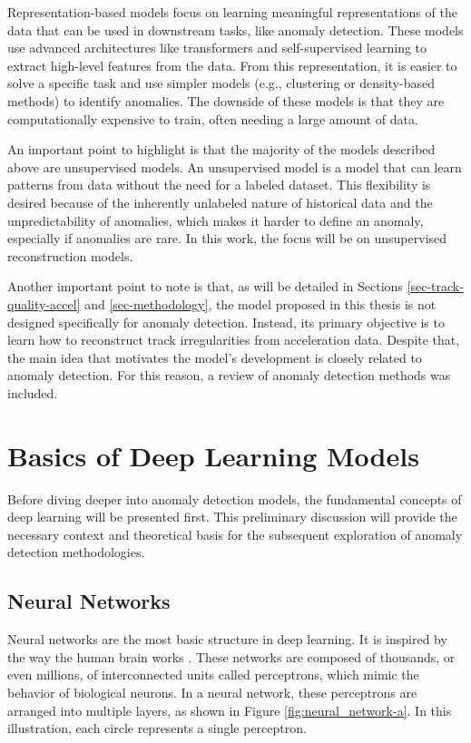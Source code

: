 Representation-based models focus on learning meaningful representations of the data that can be used in downstream tasks, like anomaly detection.  These models use advanced architectures like transformers and self-supervised learning to extract high-level features from the data. From this representation, it is easier to solve a specific task and use simpler models (e.g., clustering or density-based methods) to identify anomalies. The downside of these models is that they are computationally expensive to train, often needing a large amount of data.

An important point to highlight is that the majority of the models described above are unsupervised models. An unsupervised model is a model that can learn patterns from data without the need for a labeled dataset. This flexibility is desired because of the inherently unlabeled nature of historical data and the unpredictability of anomalies, which makes it harder to define an anomaly, especially if anomalies are rare. In this work, the focus will be on unsupervised reconstruction models.

Another important point to note is that, as will be detailed in Sections \ref{sec-track-quality-accel} and \ref{sec-methodology}, the model proposed in this thesis is not designed specifically for anomaly detection. Instead, its primary objective is to learn how to reconstruct track irregularities from acceleration data. Despite that, the main idea that motivates the model's development is closely related to anomaly detection. For this reason, a review of anomaly detection methods was included.

\section{Basics of Deep Learning Models}

Before diving deeper into anomaly detection models, the fundamental concepts of deep learning will be presented first. This preliminary discussion will provide the necessary context and theoretical basis for the subsequent exploration of anomaly detection methodologies.

\subsection{Neural Networks} \label{sec-Neural_networks}

Neural networks are the most basic structure in deep learning. It is inspired by the way the human brain works \cite{AGATONOVICKUSTRIN2000717,Alzubaidi_Zhang_Humaidi_Al_Dujaili_Duan_Al_Shamma_Santamaria_Fadhel_Al_Amidie_Farhan_2021}. These networks are composed of thousands, or even millions, of interconnected units called perceptrons, which mimic the behavior of biological neurons. In a neural network, these perceptrons are arranged into multiple layers, as shown in Figure \ref{fig:neural_network-a}. In this illustration, each circle represents a single perceptron. 

